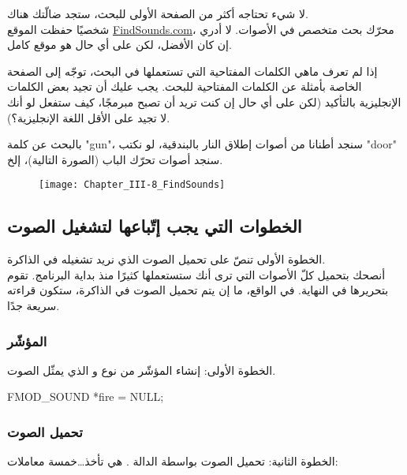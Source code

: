 لا شيء تحتاجه أكثر من الصفحة الأولى للبحث، ستجد ضالّتك هناك.\\
شخصيًا حفظت الموقع 
\href{http://www.findsounds.com/}{\textenglish{FindSounds.com}}،
محرّك بحث متخصص في الأصوات. لا أدري إن كان الأفضل، لكن على أي حال هو موقع كامل.

\begin{information}
إذا لم تعرف  ماهي الكلمات المفتاحية التي تستعملها في البحث، توجّه إلى الصفحة الخاصة بأمثلة عن الكلمات المفتاحية للبحث.
يجب عليك أن تجيد بعض الكلمات الإنجليزية بالتأكيد (لكن على أي حال إن كنت تريد أن تصبح مبرمجًا، كيف ستفعل لو أنك لا تجيد على الأقل اللغة الإنجليزية؟).
\end{information}

بالبحث عن كلمة
"\textenglish{gun}"،
سنجد أطنانا من أصوات إطلاق النار بالبندقية، لو نكتب
"\textenglish{door}"
سنجد أصوات تحرّك الباب (الصورة التالية)، إلخ.

\begin{figure}[H]
	\centering
	\texttt{[image: Chapter\_III-8\_FindSounds]}
\end{figure}

\subsection{الخطوات التي يجب إتّباعها لتشغيل الصوت}

 الخطوة الأولى تنصّ على تحميل الصوت الذي نريد تشغيله في الذاكرة.\\
أنصحك بتحميل كلّ الأصوات التي ترى أنك ستستعملها كثيرًا منذ بداية البرنامج. تقوم بتحريرها في النهاية. في الواقع، ما إن يتم تحميل الصوت في الذاكرة، ستكون قراءته سريعة جدًا.

\subsubsection{المؤشّر}

الخطوة الأولى: إنشاء المؤشّر من نوع
و الذي يمثّل الصوت.

\begin{Csource}
FMOD_SOUND *fire = NULL;
\end{Csource}

\subsubsection{تحميل الصوت}

الخطوة الثانية: تحميل الصوت بواسطة الدالة
.
هي تأخذ\dots خمسة معاملات:

